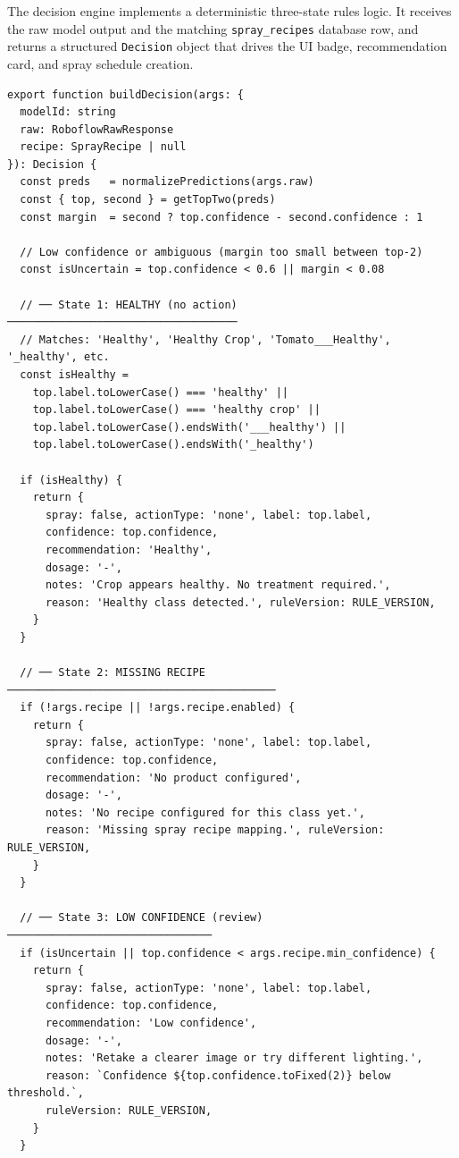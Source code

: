 \documentclass[12pt,a4paper]{report}
\begin{document}
The decision engine implements a deterministic three-state rules logic. It receives the raw model output and the matching \texttt{spray\_recipes} database row, and returns a structured \texttt{Decision} object that drives the UI badge, recommendation card, and spray schedule creation.

\begin{lstlisting}[style=typescript, caption={Three-state decision logic — Healthy / Action Required / Review (api/lib/decisionEngine.ts)}]
export function buildDecision(args: {
  modelId: string
  raw: RoboflowRawResponse
  recipe: SprayRecipe | null
}): Decision {
  const preds   = normalizePredictions(args.raw)
  const { top, second } = getTopTwo(preds)
  const margin  = second ? top.confidence - second.confidence : 1

  // Low confidence or ambiguous (margin too small between top-2)
  const isUncertain = top.confidence < 0.6 || margin < 0.08

  // ── State 1: HEALTHY (no action) ────────────────────────────────────
  // Matches: 'Healthy', 'Healthy Crop', 'Tomato___Healthy', '_healthy', etc.
  const isHealthy =
    top.label.toLowerCase() === 'healthy' ||
    top.label.toLowerCase() === 'healthy crop' ||
    top.label.toLowerCase().endsWith('___healthy') ||
    top.label.toLowerCase().endsWith('_healthy')

  if (isHealthy) {
    return {
      spray: false, actionType: 'none', label: top.label,
      confidence: top.confidence,
      recommendation: 'Healthy',
      dosage: '-',
      notes: 'Crop appears healthy. No treatment required.',
      reason: 'Healthy class detected.', ruleVersion: RULE_VERSION,
    }
  }

  // ── State 2: MISSING RECIPE ──────────────────────────────────────────
  if (!args.recipe || !args.recipe.enabled) {
    return {
      spray: false, actionType: 'none', label: top.label,
      confidence: top.confidence,
      recommendation: 'No product configured',
      dosage: '-',
      notes: 'No recipe configured for this class yet.',
      reason: 'Missing spray recipe mapping.', ruleVersion: RULE_VERSION,
    }
  }

  // ── State 3: LOW CONFIDENCE (review) ────────────────────────────────
  if (isUncertain || top.confidence < args.recipe.min_confidence) {
    return {
      spray: false, actionType: 'none', label: top.label,
      confidence: top.confidence,
      recommendation: 'Low confidence',
      dosage: '-',
      notes: 'Retake a clearer image or try different lighting.',
      reason: `Confidence ${top.confidence.toFixed(2)} below threshold.`,
      ruleVersion: RULE_VERSION,
    }
  }


\end{lstlisting}
\end{document}
